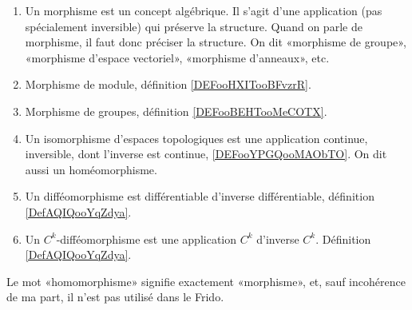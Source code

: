 
\begin{enumerate}
	\item
	      Un morphisme est un concept algébrique. Il s'agit d'une application (pas spécialement inversible) qui préserve la structure. Quand on parle de morphisme, il faut donc préciser la structure. On dit «morphisme de groupe», «morphisme d'espace vectoriel», «morphisme d'anneaux», etc.
	\item
	      Morphisme de module, définition \ref{DEFooHXITooBFvzrR}.
      \item
          Morphisme de groupes, définition \ref{DEFooBEHTooMeCOTX}.
	\item
        Un isomorphisme d'espaces topologiques est une application continue, inversible, dont l'inverse est continue, \ref{DEFooYPGQooMAObTO}. On dit aussi un homéomorphisme.
	\item
	      Un difféomorphisme est différentiable d'inverse différentiable, définition \ref{DefAQIQooYqZdya}.
	\item
	      Un \( C^k\)-difféomorphisme est une application \( C^k\) d'inverse \( C^k\). Définition \ref{DefAQIQooYqZdya}.
\end{enumerate}
Le mot «homomorphisme» signifie exactement «morphisme», et, sauf incohérence de ma part, il n'est pas utilisé dans le Frido.
